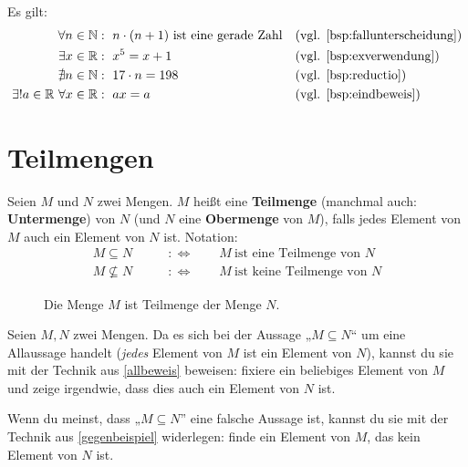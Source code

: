 \begin{bsp}[*]
    Es gilt:
    \begin{align*}
        \forall n\in \N &:\ n\cdot (n+1)\ \text{ist eine gerade Zahl} && (\text{vgl. \cref{bsp:fallunterscheidung}})\\
        \exists x\in \R &:\ x^5 = x+1 && (\text{vgl. \cref{bsp:exverwendung}})\\
        \nexists n\in \N &:\ 17\cdot n = 198 && (\text{vgl. \cref{bsp:reductio}})\\ 
        \exists ! a\in \R \ \forall x\in \R & :\ ax=a &&(\text{vgl. \cref{bsp:eindbeweis}})
    \end{align*}
\end{bsp}





\section{Teilmengen}


\begin{defin}[Teilmenge] \label{def:teilmenge} 
    Seien $M$ und $N$ zwei Mengen. $M$ heißt eine \textbf{Teilmenge} (manchmal auch: \textbf{Untermenge}) von $N$ (und $N$ eine \textbf{Obermenge} von $M$), falls jedes Element von $M$ auch ein Element von $N$ ist. Notation:
    \begin{align*}
        M \subseteq N \qquad &:\Leftrightarrow\qquad M\ \text{ist eine Teilmenge von $N$} \\
        M \nsubseteq N \qquad &:\Leftrightarrow\qquad M\ \text{ist keine Teilmenge von $N$}
    \end{align*}
\end{defin}


\begin{figure}[ht]
    \centering \caption{Die Menge $M$ ist Teilmenge der Menge $N$.}
\end{figure}


\begin{bem} \label{teilmengebeweisen}
    Seien $M,N$ zwei Mengen. Da es sich bei der Aussage „$M\subseteq N$“ um eine Allaussage handelt (\emph{jedes} Element von $M$ ist ein Element von $N$), kannst du sie mit der Technik aus \cref{allbeweis} beweisen: fixiere ein beliebiges Element von $M$ und zeige irgendwie, dass dies auch ein Element von $N$ ist.

    Wenn du meinst, dass „$M\subseteq N$” eine falsche Aussage ist, kannst du sie mit der Technik aus \cref{gegenbeispiel} widerlegen: finde ein Element von $M$, das kein Element von $N$ ist.
\end{bem}


